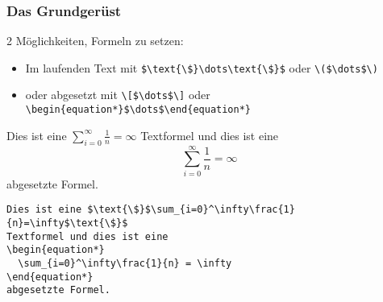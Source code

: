 \begin{frame}
  \frametitle{Das Grundgerüst}

  \onslide<+->

  2 Möglichkeiten, Formeln zu setzen:
  \begin{itemize}
  \item<+-> Im laufenden Text mit \lstinline!$\text{\$}\dots\text{\$}$! oder
    \lstinline!\($\dots$\)!
  \item<+-> oder abgesetzt mit \lstinline!\[$\dots$\]! oder
    \lstinline!\begin{equation*}$\dots$\end{equation*}!
  \end{itemize}

  \onslide<+->

  Dies ist eine $\sum_{i=0}^\infty\frac{1}{n}=\infty$ Textformel und dies ist eine
  \begin{equation*}
    \sum_{i=0}^\infty\frac{1}{n} = \infty
  \end{equation*}
  abgesetzte Formel.

  \onslide<+->

\begin{lstlisting}
Dies ist eine $\text{\$}$\sum_{i=0}^\infty\frac{1}{n}=\infty$\text{\$}$
Textformel und dies ist eine
\begin{equation*}
  \sum_{i=0}^\infty\frac{1}{n} = \infty
\end{equation*}
abgesetzte Formel.
\end{lstlisting}
\end{frame}

